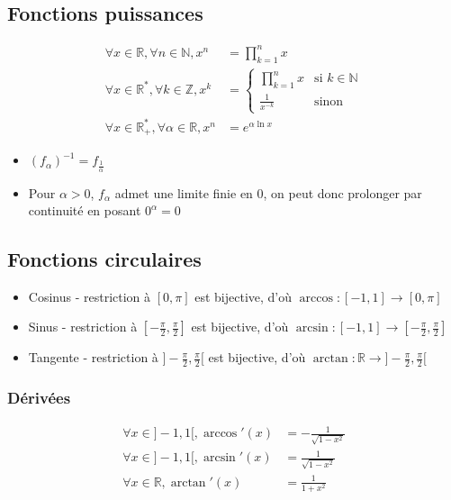\documentclass[openany]{book}
\begin{document}
\subsection{Fonctions puissances}
\begin{align*}
    \forall x \in \mathbb{R}, \forall n \in \mathbb{N}, x^n &= \prod_{k=1}^n x  \\
    \forall x \in \mathbb{R}^*, \forall k \in \mathbb{Z}, x^k &= \begin{cases}
        \prod_{k=1}^n x & \text{si } k \in \mathbb{N} \\ 
        \frac{1}{x^{-k}} & \text{sinon}
    \end{cases}   \\
    \forall x \in \mathbb{R}_+^*, \forall \alpha \in \mathbb{R}, x^n &= e^{\alpha \ln{x}}
\end{align*}

\begin{itemize}
    \item $ (f_{\alpha})^{-1} = f_{\frac{1}{\alpha}} $
    \item Pour $ \alpha > 0 $, $ f_{\alpha} $ admet une limite finie en $0$, on peut donc prolonger par continuité en posant $0^{\alpha}=0$
\end{itemize}

\subsection{Fonctions circulaires}
\begin{itemize}
    \item Cosinus - restriction à $[0, \pi]$ est bijective, d'où $ \arccos : [-1, 1] \to [0, \pi] $
    \item Sinus - restriction à $[-\frac{\pi}{2}, \frac{\pi}{2}]$ est bijective, d'où $ \arcsin : [-1, 1] \to [-\frac{\pi}{2}, \frac{\pi}{2}] $
    \item Tangente - restriction à $]-\frac{\pi}{2}, \frac{\pi}{2}[$ est bijective, d'où $ \arctan : \mathbb{R} \to ]-\frac{\pi}{2}, \frac{\pi}{2}[ $
\end{itemize}

\subsubsection{Dérivées}
\begin{align*}
    \forall x \in ]-1, 1[, \arccos'(x) &= -\frac{1}{\sqrt{1-x^2}} \\
    \forall x \in ]-1, 1[, \arcsin'(x) &= \frac{1}{\sqrt{1-x^2}} \\
    \forall x \in \mathbb{R}, \arctan'(x) &= \frac{1}{1+x^2}
\end{align*}
\end{document}
